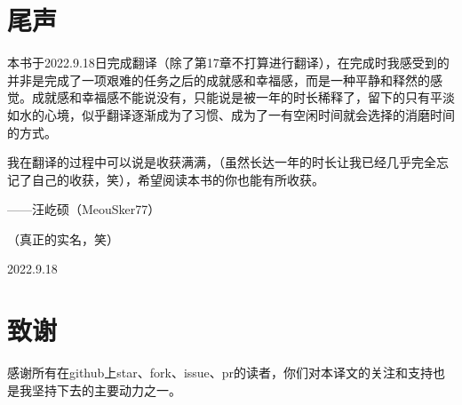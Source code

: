 \section*{尾声}
本书于2022.9.18日完成翻译（除了第17章不打算进行翻译），在完成时我感受到的并非是完成了一项艰难的任务之后的成就感和幸福感，而是一种平静和释然的感觉。成就感和幸福感不能说没有，只能说是被一年的时长稀释了，留下的只有平淡如水的心境，似乎翻译逐渐成为了习惯、成为了一有空闲时间就会选择的消磨时间的方式。

我在翻译的过程中可以说是收获满满，（虽然长达一年的时长让我已经几乎完全忘记了自己的收获，笑），希望阅读本书的你也能有所收获。

\begin{flushright}
    ——汪屹硕（MeouSker77）

    （真正的实名，笑）

    2022.9.18
\end{flushright}

\section*{致谢}
感谢所有在github上star、fork、issue、pr的读者，你们对本译文的关注和支持也是我坚持下去的主要动力之一。